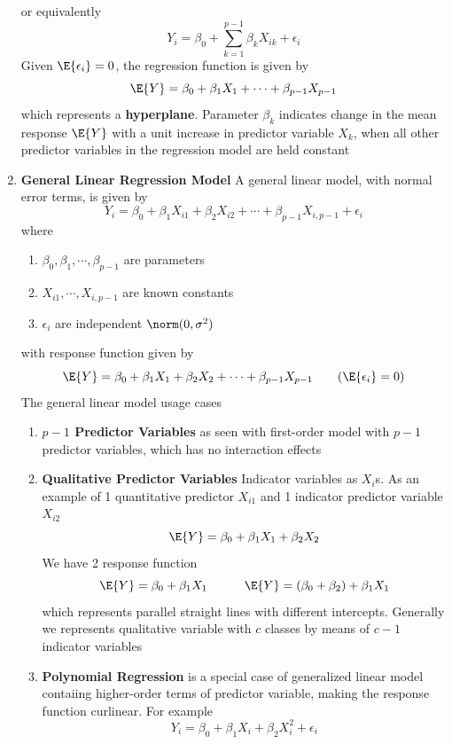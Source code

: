 \documentclass[11pt]{article}
\begin{document}
\begin{enumerate}
    or equivalently
    \[
        Y_i = \beta_0 + \sum_{k=1}^{p-1} \beta_k X_{ik} + \epsilon_i
    \]
    Given $\E\{ \epsilon_i \} = 0$, the regression function is given by
    \[
        \E\{Y\} = \beta_0 + \beta_1 X_1 + \cdots + \beta_{p-1}X_{p-1}
    \]
    which represents a \textbf{hyperplane}. Parameter $\beta_k$ indicates change in the mean response $\E\{Y\}$ with a unit increase in predictor variable $X_k$, when all other predictor variables in the regression model are held constant
    \item \textbf{General Linear Regression Model} A general linear model, with normal error terms, is given by 
    \[
        Y_i = \beta_0 + \beta_1 X_{i1} + \beta_2 X_{i2} + \cdots + \beta_{p-1}X_{i, p-1} + \epsilon_i 
    \]
    where 
    \begin{enumerate}
        \item $\beta_0, \beta_1, \cdots, \beta_{p-1}$ are parameters 
        \item $X_{i1}, \cdots, X_{i, p-1}$ are known constants 
        \item $\epsilon_i$ are independent $\norm(0, \sigma^2)$
    \end{enumerate}
    with response function given by 
    \[
        \E\{Y\} = \beta_0 + \beta_1 X_1 + \beta_2 X_2 + \cdots + \beta_{p-1}X_{p-1} \tag{$\E\{\epsilon_i\}=0$}
    \]
    The general linear model usage cases
    \begin{enumerate}
        \item \textbf{$p-1$ Predictor Variables} as seen with first-order model with $p-1$ predictor variables, which has no interaction effects
        \item \textbf{Qualitative Predictor Variables} Indicator variables as $X_i$s. As an example of 1 quantitative predictor $X_{i1}$ and 1 indicator predictor variable $X_{i2}$
        \[
            \E\{Y\} = \beta_0 + \beta_1 X_1 + \beta_2 X_2 
        \]
        We have 2 response function 
        \[
            \E\{Y\} = \beta_0 + \beta_1 X_1 
            \quad \quad \quad 
            \E\{Y\} = (\beta_0 + \beta_2) + \beta_1 X_1
        \]
        which represents parallel straight lines with different intercepts. Generally we represents qualitative variable with $c$ classes by means of $c-1$ indicator variables 
        \item \textbf{Polynomial Regression} is a special case of generalized linear model contaiing higher-order terms of predictor variable, making the response function curlinear. For example 
        \[
            Y_i = \beta_0 + \beta_1 X_i + \beta_2 X_i^2 + \epsilon_i
\]
\end{enumerate}
\end{enumerate}
\end{document}
